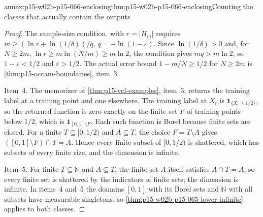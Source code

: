 \begin{annexitem}{annex:p15-w02b-p15-066-enclosing}{thm:p15-w02b-p15-066-enclosing}{Counting the classes that actually contain the outputs}
\begin{proof}
The sample-size condition.  with \(r=|H_m|\)
requires \(m\geq(\ln r+\ln(1/\delta))/q\), \(q=-\ln(1-\varepsilon)\).
Since \(\ln(1/\delta)>0\) and, for \(N\geq2m\),
\(\ln r\geq m\ln(N/m)\geq m\ln2\), the condition gives
\(mq>m\ln2\), so \(1-\varepsilon<1/2\) and \(\varepsilon>1/2\). The
actual error bound \(1-m/N\geq1/2\) for \(N\geq2m\) is
\cref{thm:p15-occam-boundaries}, item~3.

Item~4. The memorizer of \cref{thm:p15-vcl-examples}, item~3, returns
the training label at a training point and one elsewhere. The training
label at \(X_i\) is \(\mathbf1_{\{X_i\geq1/2\}}\), so the returned
function is zero exactly on the finite set \(F\) of training points below
\(1/2\), which is \(\mathbf1_{[0,1]\setminus F}\). Each such function is
Borel because finite sets are closed. For a finite
\(T\subseteq[0,1/2)\) and \(A\subseteq T\), the choice \(F=T\setminus A\)
gives \(([0,1]\setminus F)\cap T=A\). Hence every finite subset of
\([0,1/2)\) is shattered, which has subsets of every finite size, and
the dimension is infinite.

Item~5. For finite \(T\subseteq\mathbb N\) and \(A\subseteq T\), the
finite set \(A\) itself satisfies \(A\cap T=A\), so every finite set is
shattered by the indicators of finite sets; the dimension is infinite.
In items~4 and~5 the domains \([0,1]\) with its Borel sets and
\(\mathbb N\) with all subsets have measurable singletons, so
\cref{thm:p15-w02b-p15-065-lower-infinite} applies to both classes.
\end{proof}
\end{annexitem}

